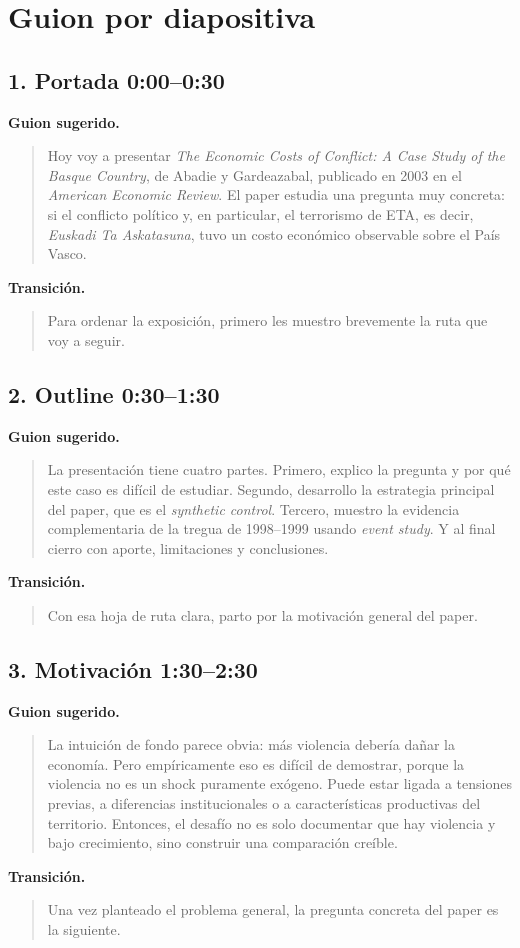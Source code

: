 \documentclass[11pt]{article}
\newcommand{\papertitle}{\emph{The Economic Costs of Conflict: A Case Study of the Basque Country}}
\newcommand{\slideentry}[2]{\subsection*{#1 \hfill #2}}
\begin{document}
\section*{Guion por diapositiva}

\slideentry{1. Portada}{0:00--0:30}

\textbf{Guion sugerido.}
\begin{quote}
Hoy voy a presentar \papertitle, de Abadie y Gardeazabal, publicado en 2003 en el \emph{American Economic Review}. El paper estudia una pregunta muy concreta: si el conflicto político y, en particular, el terrorismo de ETA, es decir, \emph{Euskadi Ta Askatasuna}, tuvo un costo económico observable sobre el País Vasco.
\end{quote}

\textbf{Transición.}
\begin{quote}
Para ordenar la exposición, primero les muestro brevemente la ruta que voy a seguir.
\end{quote}

\slideentry{2. Outline}{0:30--1:30}

\textbf{Guion sugerido.}
\begin{quote}
La presentación tiene cuatro partes. Primero, explico la pregunta y por qué este caso es difícil de estudiar. Segundo, desarrollo la estrategia principal del paper, que es el \emph{synthetic control}. Tercero, muestro la evidencia complementaria de la tregua de 1998--1999 usando \emph{event study}. Y al final cierro con aporte, limitaciones y conclusiones.
\end{quote}

\textbf{Transición.}
\begin{quote}
Con esa hoja de ruta clara, parto por la motivación general del paper.
\end{quote}

\slideentry{3. Motivación}{1:30--2:30}

\textbf{Guion sugerido.}
\begin{quote}
La intuición de fondo parece obvia: más violencia debería dañar la economía. Pero empíricamente eso es difícil de demostrar, porque la violencia no es un shock puramente exógeno. Puede estar ligada a tensiones previas, a diferencias institucionales o a características productivas del territorio. Entonces, el desafío no es solo documentar que hay violencia y bajo crecimiento, sino construir una comparación creíble.
\end{quote}

\textbf{Transición.}
\begin{quote}
Una vez planteado el problema general, la pregunta concreta del paper es la siguiente.
\end{quote}
\end{document}
